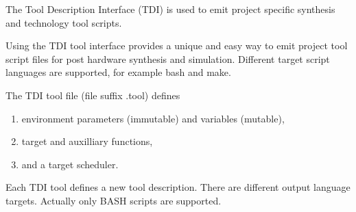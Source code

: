 \documentclass[a4paper,12pt,twoside,english]{article}
\begin{document}
\vskip5pt


\vskip10pt
\def\thesubsubsection{\vrule width 0pt height 1.3 ex}

\def\thesubsection{\vrule width 0pt height 1.3 ex}

\def\thesection{\tocCI}
\secI{\label{toclabelCI}7\hfill\thesection}
The Tool Description Interface (TDI) is used to emit project specific synthesis and technology tool
scripts.


\vskip5pt
Using the TDI tool interface provides a unique and easy way to emit project tool script files for post hardware synthesis and simulation. Different target
script languages are supported, for example bash and make.


\vskip5pt
The TDI tool file (file suffix .tool) defines


\vskip5pt

\begin{enumerate}
\item environment parameters (immutable) and variables (mutable),

\item target and auxilliary functions,

\item and a target scheduler.


\end{enumerate}

\vskip5pt
Each TDI tool defines a new tool description. There are different output language targets. Actually only BASH scripts are supported. 


\vskip5pt



\vskip5pt

\def\thesubsubsection{\vrule width 0pt height 1.3 ex}
\end{document}
